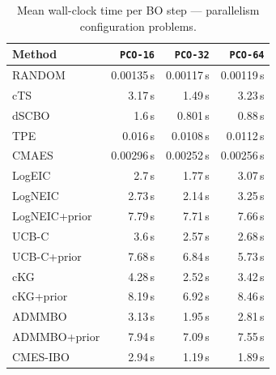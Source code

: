 \begin{table}[h]
  \centering
  \footnotesize
  \caption{Mean wall-clock time per BO step --- parallelism configuration problems.}
  \label{tab:wall_clock_pco}
  \begin{tabular}{lrrr}
    \toprule
    \textbf{Method} & \textbf{\texttt{PCO-16}} & \textbf{\texttt{PCO-32}} & \textbf{\texttt{PCO-64}} \\
    \midrule
    RANDOM & 0.00135\,s & 0.00117\,s & 0.00119\,s \\
    cTS & 3.17\,s & 1.49\,s & 3.23\,s \\
    dSCBO & 1.6\,s & 0.801\,s & 0.88\,s \\
    TPE & 0.016\,s & 0.0108\,s & 0.0112\,s \\
    CMAES & 0.00296\,s & 0.00252\,s & 0.00256\,s \\
    LogEIC & 2.7\,s & 1.77\,s & 3.07\,s \\
    LogNEIC & 2.73\,s & 2.14\,s & 3.25\,s \\
    LogNEIC+prior & 7.79\,s & 7.71\,s & 7.66\,s \\
    UCB-C & 3.6\,s & 2.57\,s & 2.68\,s \\
    UCB-C+prior & 7.68\,s & 6.84\,s & 5.73\,s \\
    cKG & 4.28\,s & 2.52\,s & 3.42\,s \\
    cKG+prior & 8.19\,s & 6.92\,s & 8.46\,s \\
    ADMMBO & 3.13\,s & 1.95\,s & 2.81\,s \\
    ADMMBO+prior & 7.94\,s & 7.09\,s & 7.55\,s \\
    CMES-IBO & 2.94\,s & 1.19\,s & 1.89\,s \\
    \bottomrule
  \end{tabular}
\end{table}

